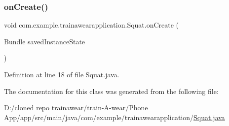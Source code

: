\subsubsection{\texorpdfstring{onCreate()}{onCreate()}}
{\footnotesize\ttfamily void com.\+example.\+trainawearapplication.\+Squat.\+on\+Create (\begin{DoxyParamCaption}\item[{Bundle}]{saved\+Instance\+State }\end{DoxyParamCaption})\hspace{0.3cm}{\ttfamily [protected]}}



Definition at line 18 of file Squat.\+java.


\begin{DoxyCode}{0}

\end{DoxyCode}


The documentation for this class was generated from the following file\+:\begin{DoxyCompactItemize}
\item 
D\+:/cloned repo trainawear/train-\/\+A-\/wear/\+Phone App/app/src/main/java/com/example/trainawearapplication/\mbox{\hyperlink{_squat_8java}{Squat.\+java}}\end{DoxyCompactItemize}
